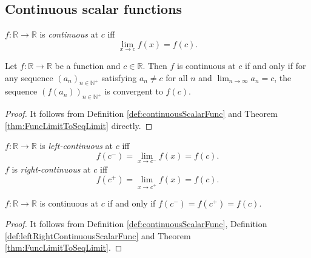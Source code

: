 
\subsection{Continuous scalar functions}
\label{sec:cont-scal-funct}

\begin{defn}
  \label{def:continuousScalarFunc}
  $f: \mathbb{R}\rightarrow \mathbb{R}$
  is \emph{continuous} at $c$
  iff
   \begin{equation}
     \label{eq:continuous}
     \lim_{x\rightarrow c} f(x) = f(c).
   \end{equation}
\end{defn}

\begin{thm}
  \label{thm:continuousEquivSeqLimit}
  Let $f:\mathbb{R}\rightarrow \mathbb{R}$ be a function
  and $c\in \mathbb{R}$.
  Then $f$ is continuous at $c$ if and only if
  for any sequence $(a_{n})_{n\in \mathbb{N}^{+}}$ satisfying
  $a_{n}\neq c$ for all $n$ and
  $\lim_{n\rightarrow\infty}a_{n}=c$, the sequence
  $(f(a_{n}))_{n\in \mathbb{N}^{+}}$ is convergent to $f(c)$.
\end{thm}
\begin{proof}
  It follows from Definition \ref{def:continuousScalarFunc}
  and Theorem \ref{thm:FuncLimitToSeqLimit} directly.
\end{proof}

\begin{defn}
  \label{def:leftRightContinuousScalarFunc}
  $f: \mathbb{R}\rightarrow \mathbb{R}$
  is \emph{left-continuous} at $c$
  iff
   \begin{equation}
     \label{eq:leftContinuous}
     f(c^{-})=\lim_{x\rightarrow c^{-}} f(x) = f(c).
   \end{equation}
   $f$ is \emph{right-continuous} at $c$ iff
   \begin{equation}
     \label{eq:rightContinuous}
     f(c^{+})=\lim_{x\rightarrow c^{+}} f(x) = f(c).
   \end{equation}
\end{defn}

\begin{thm}
  \label{thm:OneSidedContinuityAndContinuity}
  $f:\mathbb{R}\rightarrow \mathbb{R}$ is continuous at $c$
  if and only if $f(c^{-})=f(c^{+})=f(c)$.
\end{thm}
\begin{proof}
  It follows from Definition \ref{def:continuousScalarFunc},
  Definition \ref{def:leftRightContinuousScalarFunc} and
  Theorem \ref{thm:FuncLimitToSeqLimit}.
\end{proof}

